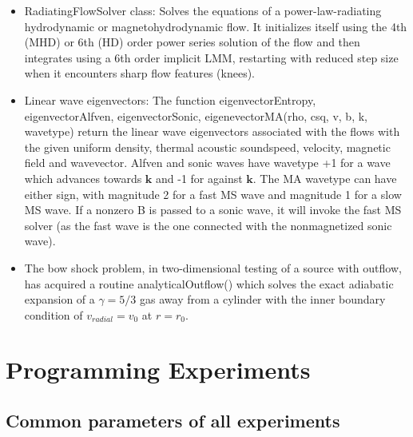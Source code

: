 \documentclass[letterpaper,12pt,twocolumn]{article}
\begin{document}
\begin{itemize}
\item RadiatingFlowSolver class: Solves the equations of a power-law-radiating hydrodynamic
or magnetohydrodynamic flow. It initializes itself using the 4th (MHD) or 6th (HD) order power
series solution of the flow and then integrates using a 6th order implicit LMM, restarting with
reduced step size when it encounters sharp flow features (knees).
\item Linear wave eigenvectors: The function eigenvectorEntropy, eigenvectorAlfven, eigenvectorSonic,
eigenevectorMA(rho, csq, v, b, k, wavetype) return the linear wave eigenvectors associated with the
flows with the given uniform density, thermal acoustic soundspeed, velocity, magnetic field and wavevector.
Alfven and sonic waves have wavetype +1 for a wave which advances towards $\mathbf{k}$ and -1 for
against $\mathbf{k}$. The MA wavetype can have either sign, with magnitude 2 for a fast MS
wave and magnitude 1 for a slow MS wave. If a nonzero B is passed to a sonic wave, it will invoke the
fast MS solver (as the fast wave is the one connected with the nonmagnetized sonic wave).
\item The bow shock problem, in two-dimensional testing of a source with outflow, has acquired a routine
analyticalOutflow() which solves the exact adiabatic expansion of a $\gamma=5/3$ gas away from a cylinder
with the inner boundary condition of $v_{radial} = v_0$ at $r=r_0$.
\end{itemize}

\section{Programming Experiments}

\subsection{Common parameters of all experiments}
\end{document}
